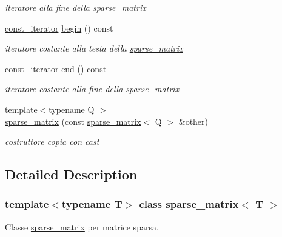 \begin{DoxyCompactItemize}
\begin{DoxyCompactList}\small\item\em iteratore alla fine della \hyperlink{classsparse__matrix}{sparse\+\_\+matrix} \end{DoxyCompactList}\item 
\mbox{\label{classsparse__matrix_aa65e9edc76508e37b64c6b9397527e25}} 
\hyperlink{classsparse__matrix_1_1const__iterator}{const\+\_\+iterator} \hyperlink{classsparse__matrix_aa65e9edc76508e37b64c6b9397527e25}{begin} () const
\begin{DoxyCompactList}\small\item\em iteratore costante alla testa della \hyperlink{classsparse__matrix}{sparse\+\_\+matrix} \end{DoxyCompactList}\item 
\mbox{\label{classsparse__matrix_af5a6f5bb6ebd5ffd40933f346852bd75}} 
\hyperlink{classsparse__matrix_1_1const__iterator}{const\+\_\+iterator} \hyperlink{classsparse__matrix_af5a6f5bb6ebd5ffd40933f346852bd75}{end} () const
\begin{DoxyCompactList}\small\item\em iteratore costante alla fine della \hyperlink{classsparse__matrix}{sparse\+\_\+matrix} \end{DoxyCompactList}\item 
{\footnotesize template$<$typename Q $>$ }\\\hyperlink{classsparse__matrix_a34c01d3cd832cad713619208512a739d}{sparse\+\_\+matrix} (const \hyperlink{classsparse__matrix}{sparse\+\_\+matrix}$<$ Q $>$ \&other)
\begin{DoxyCompactList}\small\item\em costruttore copia con cast \end{DoxyCompactList}\end{DoxyCompactItemize}


\subsection{Detailed Description}
\subsubsection*{template$<$typename T$>$\newline
class sparse\+\_\+matrix$<$ T $>$}

Classe \hyperlink{classsparse__matrix}{sparse\+\_\+matrix} per matrice sparsa. 


